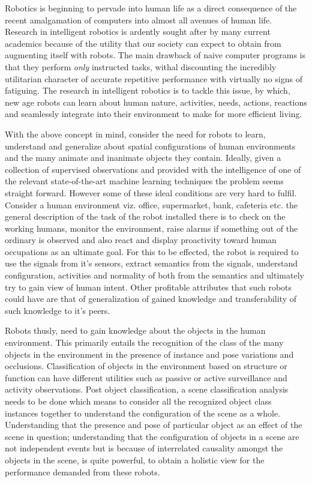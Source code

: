 \documentclass[letterpaper]{article}
\begin{document}
Robotics is beginning to pervade into human life as a direct consequence of the recent amalgamation of computers into almost all avenues of human life. Research in intelligent robotics is ardently sought after by many current academics because of the utility that our society can expect to obtain from augmenting itself with robots. The main drawback of naive computer programs is that they perform \emph{only} instructed tasks, withal discounting the incredibly utilitarian character of accurate repetitive performance with virtually no signs of fatiguing. The research in intelligent robotics is to tackle this issue, by which, new age robots can learn about human nature, activities, needs, actions, reactions and seamlessly integrate into their environment to make for more efficient living.

With the above concept in mind, consider the need for robots to learn, understand and generalize about spatial configurations of human environments and the many animate and inanimate objects they contain. Ideally, given a collection of supervised observations and provided with the intelligence of one of the relevant state-of-the-art machine learning techniques the problem seems straight forward. However some of these ideal conditions are very hard to fulfil. Consider a human environment viz. office, supermarket, bank, cafeteria etc. the general description of the task of the robot installed there is to check on the working humans, monitor the environment, raise alarms if something out of the ordinary is observed and also react and display proactivity toward human occupations as an ultimate goal. For this to be effected, the robot is required to use the signals from it's sensors, extract semantics from the signals, understand configuration, activities and normality of both from the semantics and ultimately try to gain view of human intent. Other profitable attributes that such robots could have are that of generalization of gained knowledge and transferability of such knowledge to it's peers.

Robots thusly, need to gain knowledge about the objects in the human environment. This primarily entails the recognition of the class of the many objects in the environment in the presence of instance and pose variations and occlusions. Classification of objects in the environment based on structure or function can have different utilities such as passive or active surveillance and activity observations. Post object classification, a scene classification analysis needs to be done which means to consider all the recognized object class instances together to understand the configuration of the scene as a whole. Understanding that the presence and pose of particular object as an effect of the scene in question; understanding that the configuration of objects in a scene are not independent events but is because of interrelated causality amongst the objects in the scene, is quite powerful, to obtain a holistic view for the performance demanded from these robots.
\end{document}
